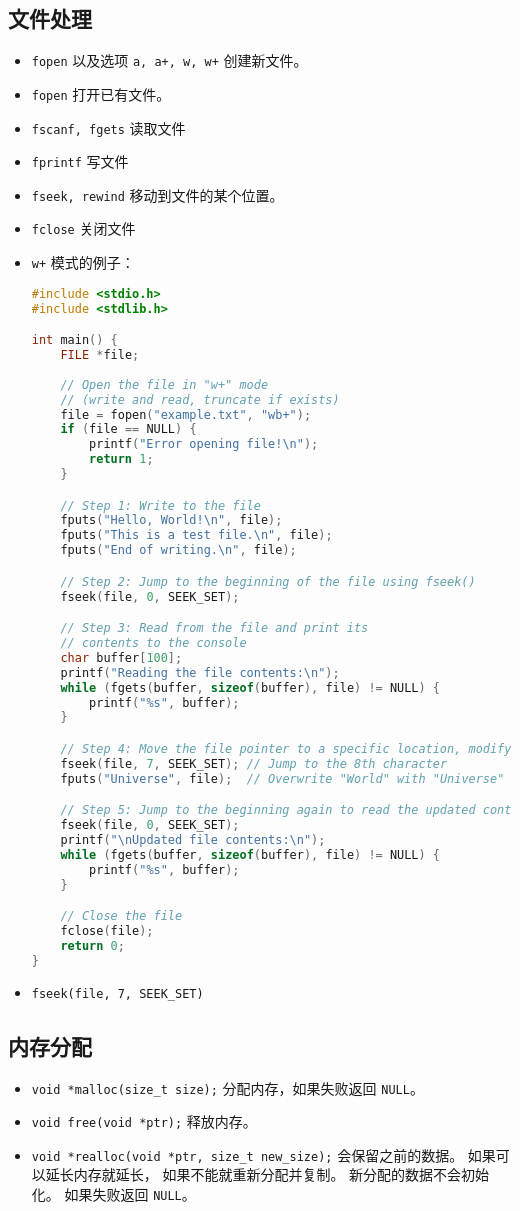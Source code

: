 \subsection{文件处理}
\begin{itemize}
\item \verb`fopen` 以及选项 \verb`a, a+, w, w+` 创建新文件。
\item \verb`fopen` 打开已有文件。
\item \verb`fscanf, fgets` 读取文件
\item \verb`fprintf` 写文件
\item \verb`fseek, rewind` 移动到文件的某个位置。
\item \verb`fclose` 关闭文件
\item \verb`w+` 模式的例子：
\begin{lstlisting}[language=cpp]
#include <stdio.h>
#include <stdlib.h>

int main() {
    FILE *file;
    
    // Open the file in "w+" mode
    // (write and read, truncate if exists)
    file = fopen("example.txt", "wb+");
    if (file == NULL) {
        printf("Error opening file!\n");
        return 1;
    }

    // Step 1: Write to the file
    fputs("Hello, World!\n", file);
    fputs("This is a test file.\n", file);
    fputs("End of writing.\n", file);

    // Step 2: Jump to the beginning of the file using fseek()
    fseek(file, 0, SEEK_SET);

    // Step 3: Read from the file and print its
    // contents to the console
    char buffer[100];
    printf("Reading the file contents:\n");
    while (fgets(buffer, sizeof(buffer), file) != NULL) {
        printf("%s", buffer);
    }

    // Step 4: Move the file pointer to a specific location, modify contents
    fseek(file, 7, SEEK_SET); // Jump to the 8th character
    fputs("Universe", file);  // Overwrite "World" with "Universe"

    // Step 5: Jump to the beginning again to read the updated content
    fseek(file, 0, SEEK_SET);
    printf("\nUpdated file contents:\n");
    while (fgets(buffer, sizeof(buffer), file) != NULL) {
        printf("%s", buffer);
    }

    // Close the file
    fclose(file);
    return 0;
}
\end{lstlisting}
\item \verb`fseek(file, 7, SEEK_SET)`
\end{itemize}



\subsection{内存分配}
\begin{itemize}
\item \verb`void *malloc(size_t size);` 分配内存，如果失败返回 \verb`NULL`。
\item \verb`void free(void *ptr);` 释放内存。
\item \verb`void *realloc(void *ptr, size_t new_size);` 会保留之前的数据。 如果可以延长内存就延长， 如果不能就重新分配并复制。 新分配的数据不会初始化。 如果失败返回 \verb`NULL`。
\end{itemize}
